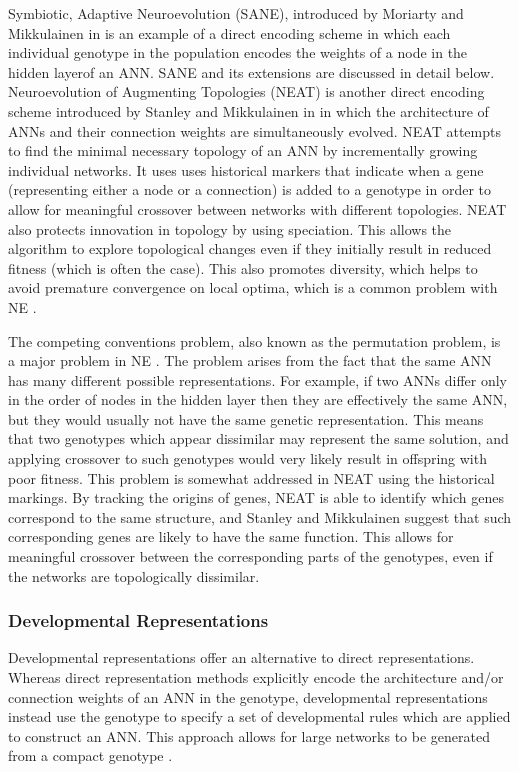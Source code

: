 \documentclass[12pt]{article} %
\begin{document}
Symbiotic, Adaptive Neuroevolution (SANE), introduced by Moriarty and Mikkulainen in \cite{Moriarty1996} is an example of a direct encoding scheme in which each individual genotype in the population encodes the weights of a node in the hidden layerof an ANN. SANE and its extensions are discussed in detail below. Neuroevolution of Augmenting Topologies (NEAT) is another direct encoding scheme introduced by Stanley and Mikkulainen in \cite{Stanley2002} in which the architecture of ANNs and their connection weights are simultaneously evolved. NEAT attempts to find the minimal necessary topology of an ANN by incrementally growing individual networks. It uses uses historical markers that indicate when a gene (representing either a node or a connection) is added to a genotype in order to allow for meaningful crossover between networks with different topologies. NEAT also protects innovation in topology by using speciation. This allows the algorithm to explore topological changes even if they initially result in reduced fitness (which is often the case). This also promotes diversity, which helps to avoid premature convergence on local optima, which is a common problem with NE \cite{Floreano2008}\cite{Moriarty1996}. 

The competing conventions problem, also known as the permutation problem, is a major problem in NE \cite{Floreano2008}\cite{Stanley2002}\cite{Yao1999}. The problem arises from the fact that the same ANN has many different possible representations. For example, if two ANNs differ only in the order of nodes in the hidden layer then they are effectively the same ANN, but they would usually not have the same genetic representation. This means that two genotypes which appear dissimilar may represent the same solution, and applying crossover to such genotypes would very likely result in offspring with poor fitness. This problem is somewhat addressed in NEAT using the historical markings. By tracking the origins of genes, NEAT is able to identify which genes correspond to the same structure, and Stanley and Mikkulainen suggest that such corresponding genes are likely to have the same function. This allows for meaningful crossover between the corresponding parts of the genotypes, even if the networks are topologically dissimilar.

\subsubsection{Developmental Representations}

Developmental representations offer an alternative to direct representations. Whereas direct representation methods explicitly encode the architecture and/or connection weights of an ANN in the genotype, developmental representations instead use the genotype to specify a set of developmental rules which are applied to construct an ANN. This approach allows for large networks to be generated from a compact genotype \cite{Floreano2008}\cite{Yao1999}.
\end{document}
